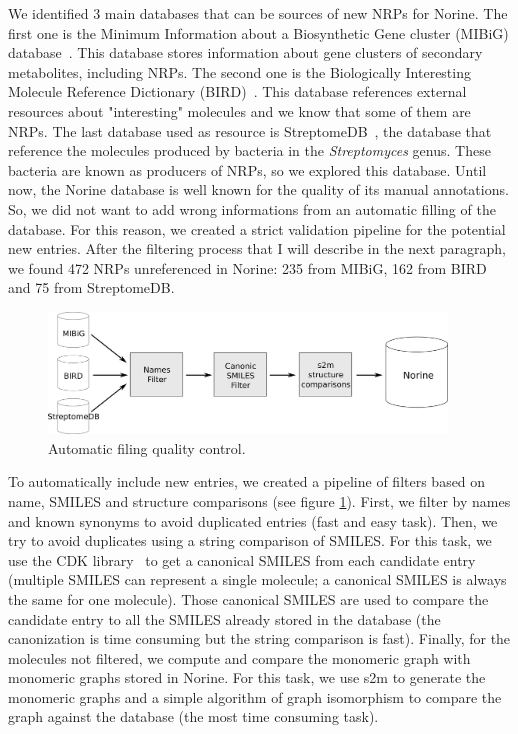 \documentclass[long, final]{jobim2017}
\begin{document}
We identified 3 main databases that can be sources of new NRPs for Norine.
The first one is the Minimum Information about a Biosynthetic Gene cluster (MIBiG) database~\cite{_mibig:_????}.
This database stores information about gene clusters of secondary metabolites, including NRPs.
The second one is the Biologically Interesting Molecule Reference Dictionary (BIRD)~\cite{berman_announcing_2003}.
This database references external resources about "interesting" molecules and we know that some of them are NRPs.
The last database used as resource is StreptomeDB~\cite{lucas_streptomedb:_2013}, the database that reference the molecules produced by bacteria in the \textit{Streptomyces} genus.
These bacteria are known as producers of NRPs, so we explored this database.
Until now, the Norine database is well known for the quality of its manual annotations.
So, we did not want to add wrong informations from an automatic filling of the database. For this reason, we created a strict validation pipeline for the potential new entries.
After the filtering process that I will describe in the next paragraph, we found 472 NRPs unreferenced in Norine: 235 from MIBiG, 162 from BIRD and 75 from StreptomeDB.

 \begin{figure}
   \begin{center}
     \includegraphics[width=400px]{figs/filters.png}
   \end{center}
   \caption{Automatic filing quality control.}
   \label{fig:quality}
 \end{figure}

To automatically include new entries, we created a pipeline of filters based on name, SMILES and structure comparisons (see figure \ref{fig:quality}).
First, we filter by names and known synonyms to avoid duplicated entries (fast and easy task).
Then, we try to avoid duplicates using a string comparison of SMILES.
For this task, we use the CDK library~\cite{steinbeck_chemistry_2003} to get a canonical SMILES from each candidate entry (multiple SMILES can represent a single molecule; a canonical SMILES is always the same for one molecule).
Those canonical SMILES are used to compare the candidate entry to all the SMILES already stored in the database (the canonization is time consuming but the string comparison is fast).
Finally, for the molecules not filtered, we compute and compare the monomeric graph with monomeric graphs stored in Norine.
For this task, we use s2m to generate the monomeric graphs and a simple algorithm of graph isomorphism to compare the graph against the database (the most time consuming task).
\end{document}
